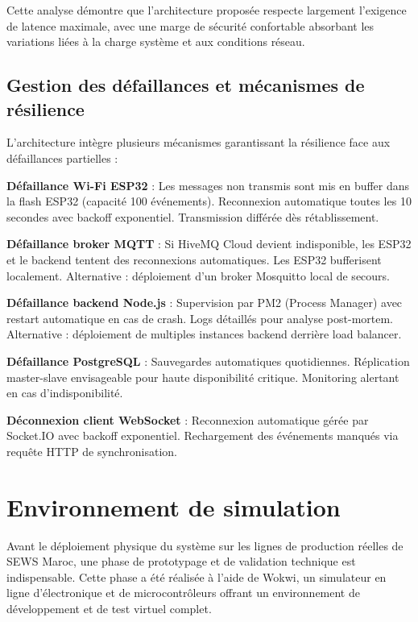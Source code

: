 Cette analyse démontre que l'architecture proposée respecte largement l'exigence de latence maximale, avec une marge de sécurité confortable absorbant les variations liées à la charge système et aux conditions réseau.

\subsection{Gestion des défaillances et mécanismes de résilience}

L'architecture intègre plusieurs mécanismes garantissant la résilience face aux défaillances partielles :

\textbf{Défaillance Wi-Fi ESP32} : Les messages non transmis sont mis en buffer dans la flash ESP32 (capacité 100 événements). Reconnexion automatique toutes les 10 secondes avec backoff exponentiel. Transmission différée dès rétablissement.

\textbf{Défaillance broker MQTT} : Si HiveMQ Cloud devient indisponible, les ESP32 et le backend tentent des reconnexions automatiques. Les ESP32 bufferisent localement. Alternative : déploiement d'un broker Mosquitto local de secours.

\textbf{Défaillance backend Node.js} : Supervision par PM2 (Process Manager) avec restart automatique en cas de crash. Logs détaillés pour analyse post-mortem. Alternative : déploiement de multiples instances backend derrière load balancer.

\textbf{Défaillance PostgreSQL} : Sauvegardes automatiques quotidiennes. Réplication master-slave envisageable pour haute disponibilité critique. Monitoring alertant en cas d'indisponibilité.

\textbf{Déconnexion client WebSocket} : Reconnexion automatique gérée par Socket.IO avec backoff exponentiel. Rechargement des événements manqués via requête HTTP de synchronisation.



\section{Environnement de simulation}

Avant le déploiement physique du système sur les lignes de production réelles de SEWS Maroc, une phase de prototypage et de validation technique est indispensable. Cette phase a été réalisée à l'aide de Wokwi, un simulateur en ligne d'électronique et de microcontrôleurs offrant un environnement de développement et de test virtuel complet.

